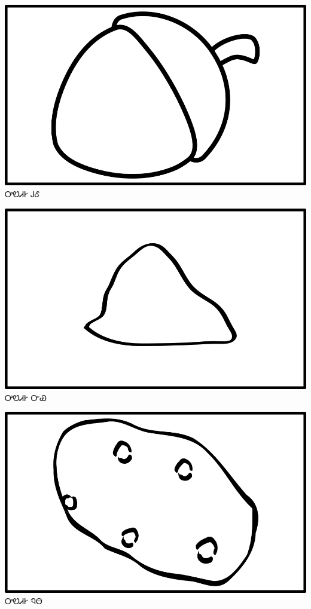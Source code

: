 \documentclass[avery5371]{flashcards}%
\begin{document}
\begin{flashcard}{
\includegraphics[width=0.95\columnwidth,height=.51\columnwidth,keepaspectratio]{../artwork/objects-neutral/gule}
}\Huge ᎤᏬᏗᎨ ᎫᎴ
\end{flashcard}

\begin{flashcard}{
\includegraphics[width=0.95\columnwidth,height=.51\columnwidth,keepaspectratio]{../artwork/objects-neutral/nvya}
}\Huge ᎤᏬᏗᎨ ᏅᏯ
\end{flashcard}

\begin{flashcard}{
\includegraphics[width=0.95\columnwidth,height=.51\columnwidth,keepaspectratio]{../artwork/objects-neutral/nuna}
}\Huge ᎤᏬᏗᎨ ᏄᎾ
\end{flashcard}
\end{document}
